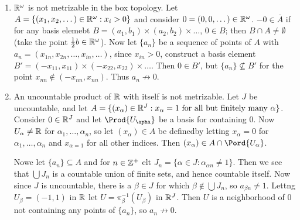 \begin{example}
    \begin{enumerate}[label=(\arabic*)]
        \item $\mathbb{R}^{\omega}$ is not metrizable in the box topology. Let $A=\{(x_1,x_2,\dots) \in
            \mathbb{R}^{\omega}:x_i>0\}$ and consider $0=(0,0,\dots) \in \mathbb{R}^{\omega}$. $-0 \in \bar{A}$ if
            for any basis elemebt $B=(a_1,b_1) \times (a_2,b_2) \times \dots$, $0 \in B$; then  $B
            \cap A \neq \emptyset$  (take the point $ \frac{1}{2}b \in \mathbb{R}^\omega$). Now let
            $\{a_n\}$ be a sequence of points of $A$ with  $a_n=(x_{1n},x_{2n}, \dots, x_ {in},
            \dots)$, since $x_{in}>0$, construct a basis element $B'=(-x_{11},x_{11}) \times
            (-x_{22},x_{22}) \times \dots$. Then $0 \in B'$, but  $\{a_n\} \not\subseteq B'$ for the
            point $x_{nn} \notin (-x_{nn},x_{nn})$. Thus $a_n \not\rightarrow 0$.

        \item An uncountable product of  $\mathbb{R}$ with itself is not metrizable. Let  $J$ be
            uncountable, and let  $A=\{(x_{\alpha}) \in \mathbb{R}^J:x_{\alpha}=1 \text{ for all but
            finitely many } \alpha\}$. Consider $0 \in \mathbb{R}^J$ and let  $\Prod{U_{\apha}}$ be a basis
            for containing $0$. Now  $U_{\alpha} \neq \mathbb{R}$ for $\alpha_1, \dots, \alpha_n$, so let
            $(x_{\alpha}) \in A$ be definedby letting $x_{\alpha}=0$ for $\alpha_1, \dots, \alpha_n$
            and $x_{\alpha=1}$ for all other indices. Then $(x_{\alpha}) \in A \cap
            \Pord{U_{\alpha}}$.

            Nowe let $\{a_n\} \subseteq A$ and for $n \in \mathbb{Z}^+$ elt  $J_n=\{\alpha \in J:
            \alpha_{\alpha n} \neq 1\}$. Then we see that $\bigcup{J_n}$ is a countable union of
            finite sets, and hence countable itself. Now since $J$ is uncountable, there is a
            $\beta \in J$ for which  $\beta \notin \bigcup{J_n}$, so $a_{\beta n} \neq 1$. Lettng
            $U_{\beta}=(-1,1)$ in $\mathbb{R}$ let  $U=\pi_{\beta}^{-1}(U_{\beta})$ in $\mathbb{R}^J$. Then  $U$ is
            a neighborhood of  $0$ not containing  any points of  $\{a_n\}$, so $a_n \not\rightarrow
            0$.
    \end{enumerate}		
\end{example} 
